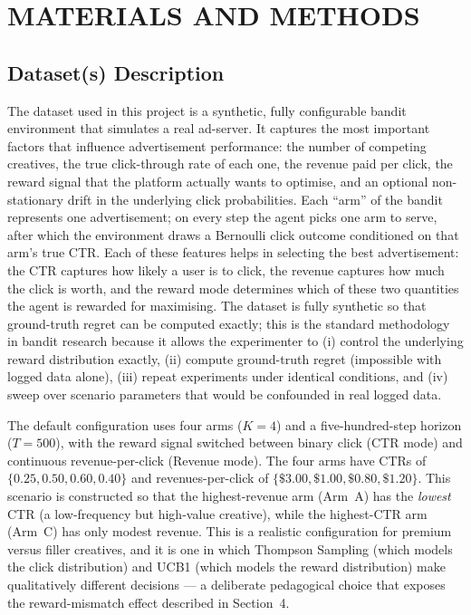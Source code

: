 \section{MATERIALS AND METHODS}

\subsection{Dataset(s) Description}
The dataset used in this project is a synthetic, fully configurable bandit environment that simulates a real ad-server. It captures the most important factors that influence advertisement performance: the number of competing creatives, the true click-through rate of each one, the revenue paid per click, the reward signal that the platform actually wants to optimise, and an optional non-stationary drift in the underlying click probabilities. Each ``arm'' of the bandit represents one advertisement; on every step the agent picks one arm to serve, after which the environment draws a Bernoulli click outcome conditioned on that arm's true CTR. Each of these features helps in selecting the best advertisement: the CTR captures how likely a user is to click, the revenue captures how much the click is worth, and the reward mode determines which of these two quantities the agent is rewarded for maximising. The dataset is fully synthetic so that ground-truth regret can be computed exactly; this is the standard methodology in bandit research because it allows the experimenter to (i) control the underlying reward distribution exactly, (ii) compute ground-truth regret (impossible with logged data alone), (iii) repeat experiments under identical conditions, and (iv) sweep over scenario parameters that would be confounded in real logged data.

The default configuration uses four arms ($K = 4$) and a five-hundred-step horizon ($T = 500$), with the reward signal switched between binary click (CTR mode) and continuous revenue-per-click (Revenue mode). The four arms have CTRs of $\{0.25, 0.50, 0.60, 0.40\}$ and revenues-per-click of $\{\$3.00, \$1.00, \$0.80, \$1.20\}$. This scenario is constructed so that the highest-revenue arm (Arm~A) has the \emph{lowest} CTR (a low-frequency but high-value creative), while the highest-CTR arm (Arm~C) has only modest revenue. This is a realistic configuration for premium versus filler creatives, and it is one in which Thompson Sampling (which models the click distribution) and UCB1 (which models the reward distribution) make qualitatively different decisions --- a deliberate pedagogical choice that exposes the reward-mismatch effect described in Section~4.

